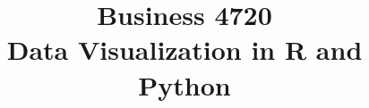 \documentclass{article}
\title{Business 4720\\ \vspace{\baselineskip}
Data Visualization in R and Python}
\begin{document}
\maketitle

\vfill

\clearpage


\end{document}
